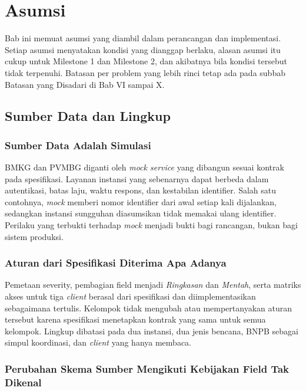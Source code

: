 \chapter{Asumsi}

Bab ini memuat asumsi yang diambil dalam perancangan dan implementasi. Setiap asumsi menyatakan kondisi yang dianggap berlaku, alasan asumsi itu cukup untuk Milestone 1 dan Milestone 2, dan akibatnya bila kondisi tersebut tidak terpenuhi. Batasan per problem yang lebih rinci tetap ada pada subbab Batasan yang Disadari di Bab VI sampai X.

\section{Sumber Data dan Lingkup}

\subsection{Sumber Data Adalah Simulasi}

BMKG dan PVMBG diganti oleh \textit{mock service} yang dibangun sesuai kontrak pada spesifikasi. Layanan instansi yang sebenarnya dapat berbeda dalam autentikasi, batas laju, waktu respons, dan kestabilan identifier. Salah satu contohnya, \textit{mock} memberi nomor identifier dari awal setiap kali dijalankan, sedangkan instansi sungguhan diasumsikan tidak memakai ulang identifier. Perilaku yang terbukti terhadap \textit{mock} menjadi bukti bagi rancangan, bukan bagi sistem produksi.

\subsection{Aturan dari Spesifikasi Diterima Apa Adanya}

Pemetaan severity, pembagian field menjadi \textit{Ringkasan} dan \textit{Mentah}, serta matriks akses untuk tiga \textit{client} berasal dari spesifikasi dan diimplementasikan sebagaimana tertulis. Kelompok tidak mengubah atau mempertanyakan aturan tersebut karena spesifikasi menetapkan kontrak yang sama untuk semua kelompok. Lingkup dibatasi pada dua instansi, dua jenis bencana, BNPB sebagai simpul koordinasi, dan \textit{client} yang hanya membaca.

\subsection{Perubahan Skema Sumber Mengikuti Kebijakan Field Tak Dikenal}

